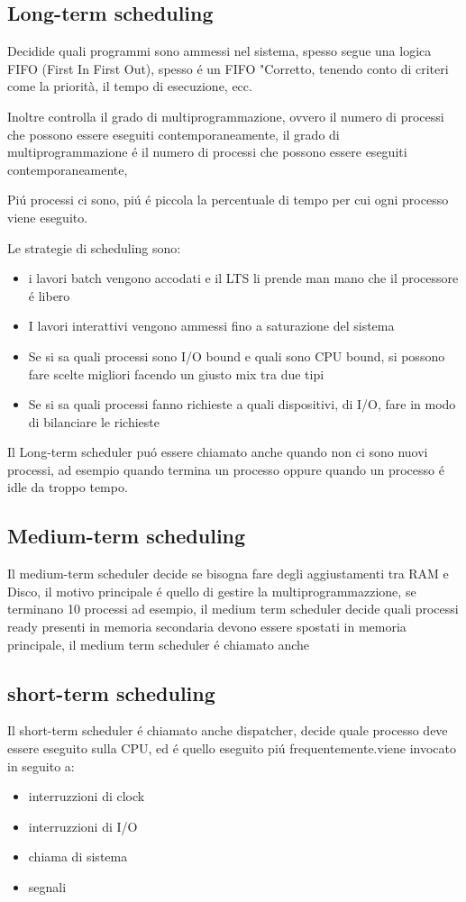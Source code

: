 \documentclass[11pt]{article}
\begin{document}
    \subsection{Long-term scheduling}
    Decidide quali programmi sono ammessi nel sistema, spesso segue una logica FIFO (First In First Out),
    spesso é un FIFO "Corretto, tenendo conto di criteri come la priorità, il tempo di esecuzione, ecc.

    Inoltre controlla il grado di multiprogrammazione, ovvero il numero di processi che possono essere eseguiti
    contemporaneamente, il grado di multiprogrammazione é il numero di processi che possono essere eseguiti
    contemporaneamente,

    Piú processi ci sono, piú é piccola la percentuale di tempo per cui ogni processo viene eseguito.

    Le strategie di scheduling sono:
    \begin{itemize}
        \item i lavori batch vengono accodati e il LTS li prende man mano che il processore é libero
        \item I lavori interattivi vengono ammessi fino a saturazione del sistema
        \item Se si sa quali processi sono I/O bound e quali sono CPU bound, si possono fare scelte migliori facendo un giusto mix tra due tipi
        \item Se si sa quali processi fanno richieste a quali dispositivi, di I/O, fare in modo di bilanciare le richieste
    \end{itemize}
    Il Long-term scheduler puó essere chiamato anche quando non ci sono nuovi processi, ad esempio quando termina un processo oppure
    quando un processo é idle da troppo tempo.

    \subsection{Medium-term scheduling}
    Il medium-term scheduler decide se bisogna fare degli aggiustamenti tra RAM e Disco, il motivo principale é quello di gestire
    la multiprogrammazzione, se terminano 10 processi ad esempio, il medium term scheduler decide quali processi ready
    presenti in memoria secondaria devono essere spostati in memoria principale, il medium term scheduler é chiamato anche
    \subsection{short-term scheduling}
    Il short-term scheduler é chiamato anche dispatcher, decide quale processo deve essere eseguito sulla CPU,
    ed é quello eseguito piú frequentemente.viene invocato in seguito a:
    \begin{itemize}
        \item interruzzioni di clock
        \item interruzzioni di I/O
        \item chiama di sistema
        \item segnali
    \end{itemize}
\end{document}
